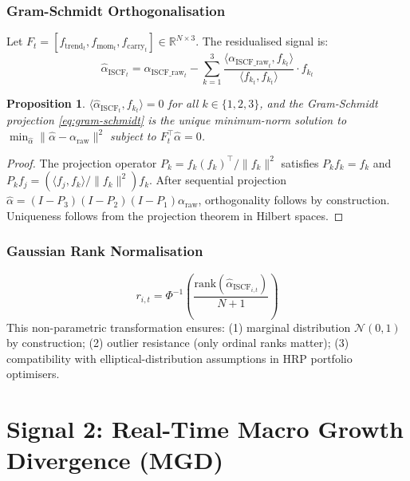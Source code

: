 \documentclass[11pt]{article}
\newtheorem{proposition}{Proposition}
\begin{document}
\subsubsection{Gram-Schmidt Orthogonalisation}

Let $F_t = [f_{\text{trend}_t}, f_{\text{mom}_t}, f_{\text{carry}_t}] \in \mathbb{R}^{N \times 3}$. The residualised signal is:
\begin{equation}
\hat{\alpha}_{\text{ISCF}_t} = \alpha_{\text{ISCF\_raw}_t} - \sum_{k=1}^{3} \frac{\langle \alpha_{\text{ISCF\_raw}_t}, f_{k_t} \rangle}{\langle f_{k_t}, f_{k_t} \rangle} \cdot f_{k_t}
\label{eq:gram-schmidt}
\end{equation}

\begin{proposition}
$\langle \hat{\alpha}_{\text{ISCF}_t}, f_{k_t} \rangle = 0$ for all $k \in \{1,2,3\}$, and the Gram-Schmidt projection \eqref{eq:gram-schmidt} is the unique minimum-norm solution to $\min_{\hat{\alpha}} \|\hat{\alpha} - \alpha_{\text{raw}}\|^2$ subject to $F_t^\top \hat{\alpha} = 0$.
\end{proposition}

\begin{proof}
The projection operator $P_k = f_k(f_k)^\top / \|f_k\|^2$ satisfies $P_k f_k = f_k$ and $P_k f_j = (\langle f_j, f_k\rangle / \|f_k\|^2) f_k$. After sequential projection $\hat{\alpha} = (I - P_3)(I-P_2)(I-P_1)\alpha_{\text{raw}}$, orthogonality follows by construction. Uniqueness follows from the projection theorem in Hilbert spaces.
\end{proof}

\subsubsection{Gaussian Rank Normalisation}

\begin{equation}
r_{i,t} = \Phi^{-1}\left(\frac{\text{rank}(\hat{\alpha}_{\text{ISCF}_{i,t}})}{N+1}\right)
\label{eq:gaussian-rank}
\end{equation}
This non-parametric transformation ensures: (1) marginal distribution $\mathcal{N}(0,1)$ by construction; (2) outlier resistance (only ordinal ranks matter); (3) compatibility with elliptical-distribution assumptions in HRP portfolio optimisers.

\section{Signal 2: Real-Time Macro Growth Divergence (MGD)}
\end{document}
